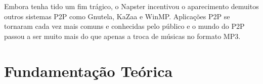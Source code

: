 \documentclass[
10pt, %
a4paper, %
oneside, %
headinclude,footinclude, %
BCOR5mm, %
]{scrartcl}
\theoremstyle{definition} %
\theoremstyle{plain} %
\theoremstyle{remark} %
\begin{document}
Embora tenha tido um fim trágico, o Napster incentivou o aparecimento demuitos outros sistemas P2P como Gnutela, KaZaa e WinMP. Aplicações P2P se tornaram cada vez mais comuns e conhecidas pelo público e o mundo do P2P passou a ser muito mais do que apenas a troca de músicas no formato MP3.

\newpage

\section{Fundamentação Teórica} 




\renewcommand{\refname}{\spacedlowsmallcaps{References}} %




\end{document}
